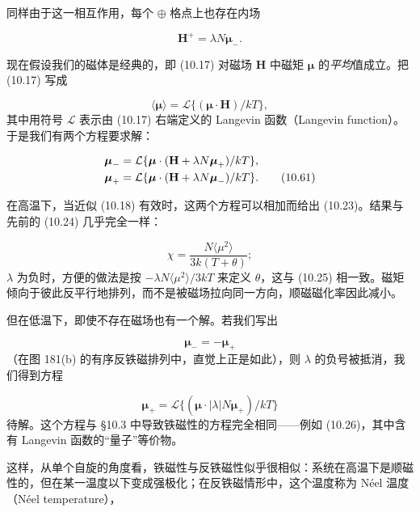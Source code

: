同样由于这一相互作用，每个 $\oplus$ 格点上也存在内场

\begin{equation*}
\mathbf{H}^+ = \lambda N \boldsymbol{\mu}_-. \tag{10.59}
\end{equation*}

现在假设我们的磁体是经典的，即 (10.17) 对磁场 $\mathbf{H}$ 中磁矩 $\boldsymbol{\mu}$ 的\emph{平均}值成立。把 (10.17) 写成

\begin{equation*}
\langle \boldsymbol{\mu} \rangle = \mathcal{L}\{(\boldsymbol{\mu}\cdot\mathbf{H})/kT\}, \tag{10.60}
\end{equation*}
其中用符号 $\mathcal{L}$ 表示由 (10.17) 右端定义的 Langevin 函数（Langevin function）。于是我们有两个方程要求解：

\begin{align*}
\boldsymbol{\mu}_- &= \mathcal{L}\{\boldsymbol{\mu}\cdot(\mathbf{H}+\lambda N\boldsymbol{\mu}_+)/kT\}, \notag \\
\boldsymbol{\mu}_+ &= \mathcal{L}\{\boldsymbol{\mu}\cdot(\mathbf{H}+\lambda N\boldsymbol{\mu}_-)/kT\}. \tag{10.61}
\end{align*}

在高温下，当近似 (10.18) 有效时，这两个方程可以相加而给出 (10.23)。结果与先前的 (10.24) 几乎完全一样：

\begin{equation*}
\chi = \frac{N\langle\mu^2\rangle}{3k(T+\theta)}; \tag{10.62}
\end{equation*}
$\lambda$ 为负时，方便的做法是按 $-\lambda N\langle\mu^2\rangle/3kT$ 来定义 $\theta$，这与 (10.25) 相一致。磁矩倾向于彼此反平行地排列，而不是被磁场拉向同一方向，顺磁磁化率因此减小。

但在低温下，即使不存在磁场也有一个解。若我们写出

\begin{equation*}
\boldsymbol{\mu}_- = -\boldsymbol{\mu}_+ \tag{10.63}
\end{equation*}
（在图 181(b) 的有序反铁磁排列中，直觉上正是如此），则 $\lambda$ 的负号被抵消，我们得到方程

\begin{equation*}
\boldsymbol{\mu}_+ = \mathcal{L}\{(\boldsymbol{\mu}\cdot|\lambda|N\boldsymbol{\mu}_+)/kT\} \tag{10.64}
\end{equation*}
待解。这个方程与 §10.3 中导致铁磁性的方程完全相同——例如 (10.26)，其中含有 Langevin 函数的“量子”等价物。

这样，从单个自旋的角度看，铁磁性与反铁磁性似乎很相似：系统在高温下是顺磁性的，但在某一温度以下变成强极化；在反铁磁情形中，这个温度称为 Néel 温度（Néel temperature），

